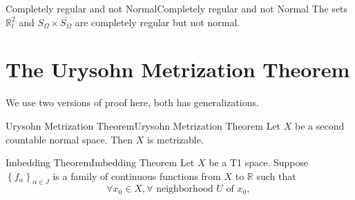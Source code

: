 \documentclass[../main.tex]{subfiles}
\begin{document}
\begin{example}{Completely regular and not Normal}{Completely regular and not Normal}
The sets $\mathbb{R}_l^2$ and $S_{\Omega}\times \overline{S_{\Omega}}$ are completely regular but not normal.
\end{example}

\section{The Urysohn Metrization Theorem}

We use two versions of proof here, both has generalizations.
\begin{theorem}{Urysohn Metrization Theorem}{Urysohn Metrization Theorem}
	Let $X$ be a second countable normal space. Then $X$ is metrizable.
\end{theorem}

\begin{theorem}{Imbedding Theorem}{Imbedding Theorem}
	Let $X$ be a T1 space. Suppose $\left\{ f_{\alpha} \right\}_{\alpha\in J}$ is a family of continuous functions from $X$ to $\mathbb{R}$ such that
	\begin{equation*}
	\forall x_0\in X, \forall \text{ neighborhood $U$ of $x_0$, } 
	\end{equation*}
\end{theorem}
\end{document}
